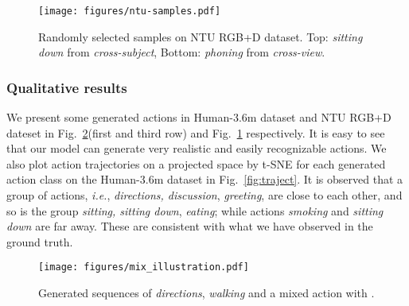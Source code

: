 \documentclass[runningheads]{llncs}
\begin{document}
\begin{table}[!t]
    \centering
    \caption{\small{Model comparisons in terms of MMD on NTU RGB+D.}}
    \label{tab:mmd-ntu}
\end{table}


\begin{figure}[!htbp]
    \centering
    \texttt{[image: figures/ntu-samples.pdf]}
    \caption{\small{Randomly selected samples on NTU RGB+D dataset. Top: \textit{sitting down} from \textit{cross-subject}, Bottom: \textit{phoning} from \textit{cross-view}.}}
    \label{fig:ntu-samples}
\end{figure}
\subsubsection{Qualitative results}
We present some generated actions in Human-3.6m dataset and NTU RGB+D dateset in Fig.~\ref{fig:mix-samples}(first and third row) and Fig.~\ref{fig:ntu-samples} respectively. It is easy to see that our model can generate very realistic and easily recognizable actions. We also plot action trajectories on a projected space by t-SNE \cite{maaten2008visualizing} for each generated action class on the Human-3.6m dataset in Fig.~\ref{fig:traject}. It is observed that a group of actions, {\it i.e.}, \textit{directions, discussion}, \textit{greeting}, are close to each other, and so is the group \textit{sitting, sitting down}, \textit{eating}; while actions \textit{smoking} and \textit{sitting down} are far away. These are consistent with what we have observed in the ground truth.
\begin{figure}[!htbp]
    \centering
    \texttt{[image: figures/mix\_illustration.pdf]}
    \caption{\small{Generated sequences of \textit{directions}, \textit{walking} and a mixed action with .}}
    \label{fig:mix-samples}
\end{figure}
\end{document}
